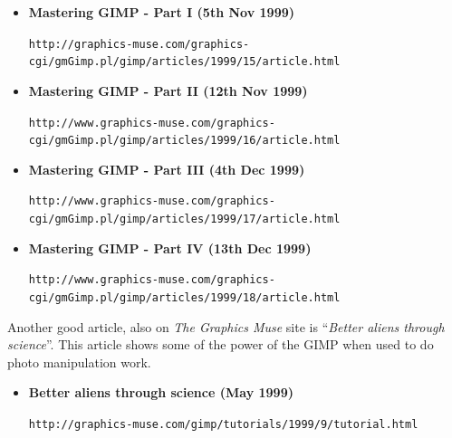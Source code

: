\documentclass[twoside,11pt]{article}
\newcommand{\htmladdnormallink}[2]{#1}
\begin{document}
\begin{itemize}
\item {\bf Mastering GIMP - Part I (5th Nov 1999)}\\
\begin{tiny}\htmladdnormallink{{\tt http://graphics-muse.com/graphics-cgi/gmGimp.pl/gimp/articles/1999/15/article.html}}{http://graphics-muse.com/graphics-cgi/gmGimp.pl/gimp/articles/1999/15/article.html}\end{tiny}

\item {\bf Mastering GIMP - Part II (12th Nov 1999)}\\
\begin{tiny}\htmladdnormallink{{\tt http://www.graphics-muse.com/graphics-cgi/gmGimp.pl/gimp/articles/1999/16/article.html}}{http://www.graphics-muse.com/graphics-cgi/gmGimp.pl/gimp/articles/1999/16/article.html}\end{tiny}

\item {\bf Mastering GIMP - Part III (4th Dec 1999)}\\
\begin{tiny}\htmladdnormallink{{\tt http://www.graphics-muse.com/graphics-cgi/gmGimp.pl/gimp/articles/1999/17/article.html}}{http://www.graphics-muse.com/graphics-cgi/gmGimp.pl/gimp/articles/1999/17/article.html}\end{tiny}

\item {\bf Mastering GIMP - Part IV (13th Dec 1999)}\\
\begin{tiny}\htmladdnormallink{{\tt http://www.graphics-muse.com/graphics-cgi/gmGimp.pl/gimp/articles/1999/18/article.html}}{http://www.graphics-muse.com/graphics-cgi/gmGimp.pl/gimp/articles/1999/18/article.html}\end{tiny}
\end{itemize}

Another good article, also on \htmladdnormallink{{\em The Graphics Muse}}{http://graphics-muse.com/} site is ``{\em Better aliens through science}''. This article  shows some of the power of the GIMP when used to do photo manipulation work.

\begin{itemize}
\item {\bf Better aliens through science (May 1999)}\\
\begin{small}\htmladdnormallink{{\tt http://graphics-muse.com/gimp/tutorials/1999/9/tutorial.html}}{http://graphics-muse.com/gimp/tutorials/1999/9/tutorial.html}\end{small}
\end{itemize}
\end{document}
